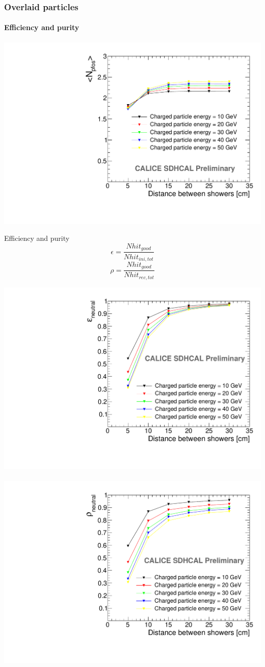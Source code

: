 \documentclass[8pt]{beamer}
\begin{document}
 
  \begin{frame}
  \frametitle{Overlaid particles}
  \framesubtitle{Efficiency and purity}
    
    \begin{minipage}{0.49\linewidth}
      \begin{center}
        \includegraphics[width=0.8\linewidth]{OverlayEvent_NPfos.pdf}     
      \end{center}
    \end{minipage} \hfill
    \begin{minipage}{0.49\linewidth}
      \begin{block}{Efficiency and purity}
        \begin{equation}
          \epsilon = \frac{Nhit_{good}}{Nhit_{ini,tot}}
        \end{equation}
        \begin{equation}
          \rho = \frac{Nhit_{good}}{Nhit_{rec,tot}}
        \end{equation}
      \end{block}
    \end{minipage}
    \begin{center}
      \includegraphics[width=0.4\linewidth]{OverlayEvent_NeutralEfficiency.pdf} ~~~~~~~~~~~~~~~~
      \includegraphics[width=0.4\linewidth]{OverlayEvent_NeutralPurity.pdf}     
    \end{center}
  \end{frame}
\end{document}
